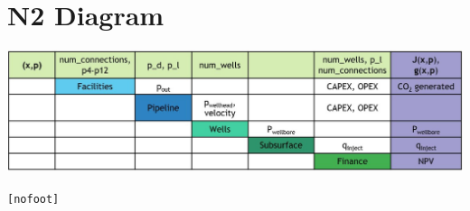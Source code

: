 \documentclass[balance,upint,subscriptcorrection,varvw,mathalfa=cal=boondoxo,spanish,french,vietnamese,russian,greek,pdf-a,colorlinks]{asmeconf}
\begin{document}
\section[Appendix B]{N2 Diagram}\label{appendix:a}
\begin{center}
    \includegraphics[width=2\linewidth]{images/n2_diagram.jpg}
\end{center}
\texttt{[nofoot]}




\end{document}
